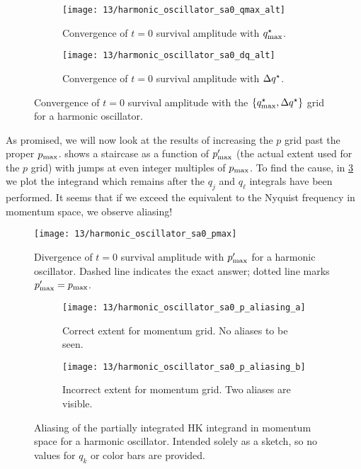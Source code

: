 \begin{figure}
	\setlength{\figspacing}{5 mm}
	\centering
	\begin{subfigure}[b]{\textwidth}
		\texttt{[image: 13/harmonic\_oscillator\_sa0\_qmax\_alt]}
		\caption{
			Convergence of $t = 0$ survival amplitude with $q_\mathrm{max}^\star$.
		}
		\vspace{\figspacing}
	\end{subfigure}
	\begin{subfigure}[b]{\textwidth}
		\texttt{[image: 13/harmonic\_oscillator\_sa0\_dq\_alt]}
		\caption{
			Convergence of $t = 0$ survival amplitude with $\Delta q^\star$.
		}
	\end{subfigure}
	\caption[
		Convergence of harmonic oscillator survival amplitude with position grids \cont
	]{
		Convergence of $t = 0$ survival amplitude with the $\{ q_\mathrm{max}^\star, \Delta q^\star \}$ grid for a harmonic oscillator.
		\explainplotsazero{}
	}
	\label{fig:harmonic-oscillator-survival-zero-q-b}
\end{figure}

As promised, we will now look at the results of increasing the $p$ grid past the proper $p_\mathrm{max}$.
 shows a staircase as a function of $p_\mathrm{max}'$ (the actual extent used for the $p$ grid) with jumps at even integer multiples of $p_\mathrm{max}$.
To find the cause, in \cref{fig:harmonic-oscillator-survival-zero-p-aliasing} we plot the integrand which remains after the $q_j$ and $q_\ell$ integrals have been performed.
It seems that if we exceed the equivalent to the Nyquist frequency in momentum space, we observe aliasing!

\begin{figure}
	\centering
	\texttt{[image: 13/harmonic\_oscillator\_sa0\_pmax]}
	\caption[
		Divergence of harmonic oscillator survival amplitude with momentum grid
	]{
		Divergence of $t = 0$ survival amplitude with $p_\mathrm{max}'$ for a harmonic oscillator.
		Dashed line indicates the exact answer; dotted line marks $p_\mathrm{max}' = p_\mathrm{max}$.
	}
	\label{fig:harmonic-oscillator-survival-zero-pmax}
\end{figure}

\begin{figure}
	\centering
	\begin{subfigure}{0.48\textwidth}
		\texttt{[image: 13/harmonic\_oscillator\_sa0\_p\_aliasing\_a]}
		\caption{
			Correct extent for momentum grid.
			No aliases to be seen.
		}
	\end{subfigure}
	\hfill
	\begin{subfigure}{0.48\textwidth}
		\texttt{[image: 13/harmonic\_oscillator\_sa0\_p\_aliasing\_b]}
		\caption{
			Incorrect extent for momentum grid.
			Two aliases are visible.
		}
	\end{subfigure}
	\caption[
		Aliasing of integrand in momentum space
	]{
		Aliasing of the partially integrated HK integrand in momentum space for a harmonic oscillator.
		Intended solely as a sketch, so no values for $q_k$ or color bars are provided.
	}
	\label{fig:harmonic-oscillator-survival-zero-p-aliasing}
\end{figure}

